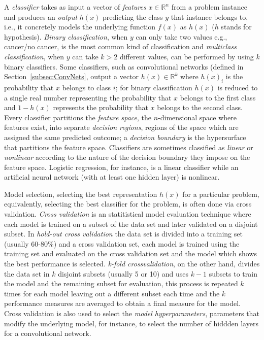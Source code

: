 A \emph{classifier} takes as input a vector of \emph{features} $x \in \mathbb{R}^n$ from a problem instance and produces an \emph{output} $h(x)$ predicting the class $y$ that instance belongs to, i.e., it concretely models the underlying function $f(x)$ as $h(x)$ ($h$ stands for hypothesis). \emph{Binary classification}, when $y$ can only take two values e.g., cancer/no cancer, is the most common kind of classification and \emph{multiclass classification}, when $y$ can take $k > 2$ different values, can be performed by using $k$ binary classifiers. Some classifiers, such as convolutional networks (defined in Section~\ref{subsec:ConvNets}, output a vector $h(x) \in \mathbb{R}^k$ where $h(x)_i$ is the probability that $x$ belongs to class $i$; for binary classification $h(x)$ is reduced to a single real number representing the probability that $x$ belongs to the first class and $1-h(x)$ represents the probability that $x$ belongs to the second class. Every classifier partitions the \emph{feature space}, the $n$-dimensional space where features exist, into separate \emph{decision regions}, regions of the space which are assigned the same predicted outcome; a \emph{decision boundary} is the hypersurface that partitions the feature space. Classifiers are sometimes classified as \emph{linear} or \emph{nonlinear} according to the nature of the decision boundary they impose on the feature space. Logistic regression, for instance, is a linear classifier while an artificial neural network (with at least one hidden layer) is nonlinear.

Model selection, selecting the best representation $h(x)$ for a particular problem, equivalently, selecting the best classifier for the problem, is often done via cross validation. \emph{Cross validation} is an statitistical model evaluation technique where each model is trained on a subset of the data set and later validated on a disjoint subset. In \emph{hold-out cross validation} the data set is divided into a training set (usually 60-80\%) and a cross validation set, each model is trained using the training set and evaluated on the cross validation set and the model which shows the best performance is selected. \emph{k-fold crossvalidation}, on the other hand, divides the data set in $k$ disjoint subsets (usually 5 or 10) and uses $k-1$ subsets to train the model and the remaining subset for evaluation, this process is repeated $k$ times for each model leaving out a different subset each time and the $k$ performance measures are averaged to obtain a final measure for the model. Cross validation is also used to select the \emph{model hyperparameters}, parameters that modify the underlying model, for instance, to select the number of hiddden layers for a convolutional network.

